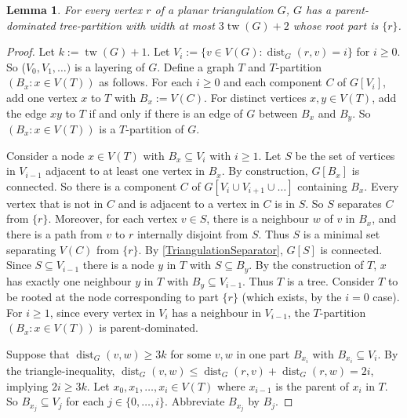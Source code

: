 \documentclass[11pt]{article}
\newcommand{\defn}[1]{\textcolor{Maroon}{\emph{#1}}}
\renewcommand{\geq}{\geqslant}
\renewcommand{\leq}{\leqslant}
\DeclareMathOperator{\dist}{dist}
\DeclareMathOperator{\tw}{tw}
\theoremstyle{plain}
\newtheorem{lem}[thm]{Lemma}
\theoremstyle{definition}
\newcommand{\PP}{\mathcal{P}}
\begin{document}
		\begin{lem}\label{lem:twdiamparts}
			For every vertex $r$ of a planar triangulation $G$, $G$ has a parent-dominated tree-partition with width at most $3\tw(G)+2$ whose root part is $\{r\}$.
		\end{lem}
		
		\begin{proof}
			Let $k:=\tw(G)+1$. Let $V_i:=\{v\in V(G):\dist_G(r,v)=i\}$ for $i\geq 0$. So ($V_0,V_1,\dots)$ is a layering of $G$. Define a graph $T$ and $T$-partition $(B_x:x\in V(T))$ as follows. For each $i\geq 0$ and each component $C$ of $G[V_i]$, add one vertex $x$ to $T$ with $B_x:=V(C)$. For distinct vertices $x,y\in V(T)$, add the edge $xy$ to $T$ if and only if there is an edge of $G$ between $B_x$ and $B_y$. So $(B_x:x\in V(T))$ is a $T$-partition of $G$. 
			
			Consider a node $x\in V(T)$ with $B_x\subseteq V_i$ with $i\geq 1$. Let $S$ be the set of vertices in $V_{i-1}$ adjacent to at least one vertex in $B_x$. By construction, $G[B_x]$ is connected. So there is a component $C$ of $G[V_i\cup V_{i+1}\cup \dots]$ containing $B_x$. Every vertex that is not in $C$ and is adjacent to a vertex in $C$ is in $S$. So $S$ separates $C$ from $\{r\}$. Moreover, for each vertex $v\in S$, there is a neighbour $w$ of $v$ in $B_x$, and there is a path from $v$ to $r$ internally disjoint from $S$. Thus $S$ is a minimal set separating $V(C)$ from $\{r\}$. By \cref{TriangulationSeparator}, $G[S]$ is connected. Since $S\subseteq V_{i-1}$ there is a node $y$ in $T$ with $S\subseteq B_y$. By the construction of $T$, $x$ has exactly one neighbour $y$ in $T$ with $B_y\subseteq V_{i-1}$. Thus $T$ is a tree. Consider $T$ to be rooted at the node corresponding to part $\{r\}$ (which exists, by the $i=0$ case). For $i\geq 1$, since every vertex in $V_i$ has a neighbour in $V_{i-1}$, the $T$-partition $(B_x:x\in V(T))$ is parent-dominated.
			
			Suppose that $\dist_G(v,w)\geq 3k$ for some $v,w$ in one part $B_{x_i}$ with $B_{x_i} \subseteq V_i$. By the triangle-inequality, $\dist_G(v,w) \leq \dist_G(r,v)+\dist_G(r,w)=2i$, implying $2i\geq 3k$. Let 
			$x_0,x_1,\dots,x_i\in V(T)$ where $x_{i-1}$ is the parent of $x_i$ in $T$. So $B_{x_j}\subseteq V_j$ for each $j\in\{0,\dots,i\}$. Abbreviate $B_{x_j}$ by $B_j$. 
			

\end{proof}
\end{document}
